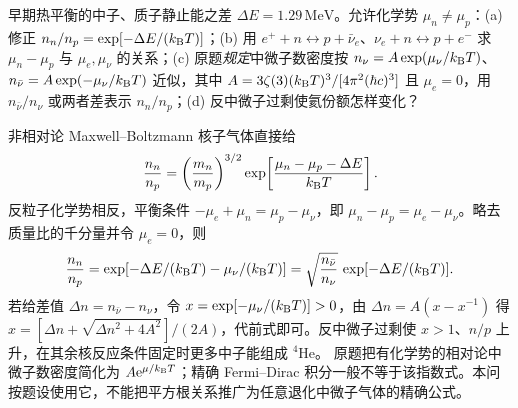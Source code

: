 \begin{exercise}
早期热平衡的中子、质子静止能之差 $\Delta E=1.29\,\mathrm{MeV}$。允许化学势 $\mu_n\ne\mu_p$：(a) 修正 $n_n/n_p=\exp[-\Delta E/(k_{\mathrm B} T)]$；(b) 用 $e^++n\leftrightarrow p+\bar\nu_e$、$\nu_e+n\leftrightarrow p+e^-$ 求 $\mu_n-\mu_p$ 与 $\mu_e,\mu_\nu$ 的关系；(c) 原题\emph{规定}中微子数密度按 $n_\nu=A\exp(\mu_\nu/k_{\mathrm B} T)$、$n_{\bar\nu}=A\exp(-\mu_\nu/k_{\mathrm B} T)$ 近似，其中 $A=3\zeta(3)(k_{\mathrm B} T)^3/[4\pi^2(\hbar c)^3]$ 且 $\mu_e=0$，用 $n_{\bar\nu}/n_\nu$ 或两者差表示 $n_n/n_p$；(d) 反中微子过剩使氦份额怎样变化？
\end{exercise}
\begin{solution}
非相对论 Maxwell--Boltzmann 核子气体直接给
\[
\frac{n_n}{n_p}=\left(\frac{m_n}{m_p}\right)^{3/2}
\exp\!\left[\frac{\mu_n-\mu_p-\Delta E}{k_{\mathrm B} T}\right].
\]
反粒子化学势相反，平衡条件 $-\mu_e+\mu_n=\mu_p-\mu_\nu$，即 $\mu_n-\mu_p=\mu_e-\mu_\nu$。略去质量比的千分量并令 $\mu_e=0$，则
\[
\frac{n_n}{n_p}=\exp[-\Delta E/(k_{\mathrm B} T)-\mu_\nu/(k_{\mathrm B} T)]
=\sqrt{\frac{n_{\bar\nu}}{n_\nu}}\,
\exp[-\Delta E/(k_{\mathrm B} T)].
\]
若给差值 $\Delta n=n_{\bar\nu}-n_\nu$，令 $x=\exp[-\mu_\nu/(k_{\mathrm B} T)]>0$，由 $\Delta n=A(x-x^{-1})$ 得
$x=[\Delta n+\sqrt{\Delta n^2+4A^2}]/(2A)$，代前式即可。反中微子过剩使 $x>1$、$n/p$ 上升，在其余核反应条件固定时更多中子能组成 $^4\mathrm{He}$。
原题把有化学势的相对论中微子数密度简化为 $A\mathrm e^{\mu/k_{\mathrm B} T}$；精确 Fermi--Dirac 积分一般不等于该指数式。本问按题设使用它，不能把平方根关系推广为任意退化中微子气体的精确公式。
\end{solution}

